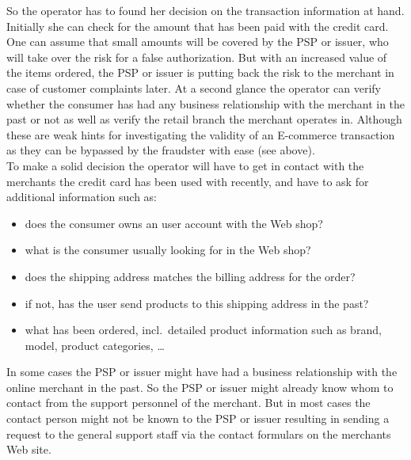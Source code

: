 So the operator has to found her decision on the transaction information at hand. Initially she can check for the amount that has been paid with the credit card. One can assume that small amounts will be covered by the \gls{PSP} or issuer, who will take over the risk for a false authorization. But with an increased value of the items ordered, the \gls{PSP} or issuer is putting back the risk to the merchant in case of customer complaints later. At a second glance the operator can verify whether the consumer has had any business relationship with the merchant in the past or not as well as verify the retail branch the merchant operates in. Although these are weak hints for investigating the validity of an E-commerce transaction as they can be bypassed by the fraudster with ease (see above). \\

To make a solid decision the operator will have to get in contact with the merchants the credit card has been used with recently, and have to ask for additional information such as:\@

\begin{itemize}
  \item does the consumer owns an user account with the Web shop?
  \item what is the consumer usually looking for in the Web shop?
  \item does the shipping address matches the billing address for the order?
  \item if not, has the user send products to this shipping address in the past?
  \item what has been ordered, incl.\ detailed product information such as brand, model, product categories, \ldots
\end{itemize}

In some cases the \gls{PSP} or issuer might have had a business relationship with the online merchant in the past. So the \gls{PSP} or issuer might already know whom to contact from the support personnel of the merchant. But in most cases the contact person might not be known to the \gls{PSP} or issuer resulting in sending a request to the general support staff via the contact formulars on the merchants Web site. \\


